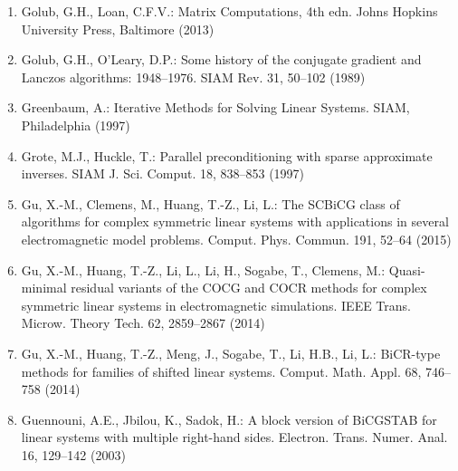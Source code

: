 \begin{enumerate}[label=\arabic*.,ref=\arabic*,leftmargin=3em]
\item\label{bib:source-79}Golub, G.H., Loan, C.F.V.: Matrix Computations, 4th edn. Johns Hopkins University Press, Baltimore (2013)

\item\label{bib:source-80}Golub, G.H., O’Leary, D.P.: Some history of the conjugate gradient and Lanczos algorithms: 1948–1976. SIAM Rev. 31, 50–102 (1989)

\item\label{bib:source-81}Greenbaum, A.: Iterative Methods for Solving Linear Systems. SIAM, Philadelphia (1997)

\item\label{bib:source-82}Grote, M.J., Huckle, T.: Parallel preconditioning with sparse approximate inverses. SIAM J. Sci. Comput. 18, 838–853 (1997)

\item\label{bib:source-83}Gu, X.-M., Clemens, M., Huang, T.-Z., Li, L.: The SCBiCG class of algorithms for complex symmetric linear systems with applications in several electromagnetic model problems. Comput. Phys. Commun. 191, 52–64 (2015)

\item\label{bib:source-84}Gu, X.-M., Huang, T.-Z., Li, L., Li, H., Sogabe, T., Clemens, M.: Quasi-minimal residual variants of the COCG and COCR methods for complex symmetric linear systems in electromagnetic simulations. IEEE Trans. Microw. Theory Tech. 62, 2859–2867 (2014)

\item\label{bib:source-85}Gu, X.-M., Huang, T.-Z., Meng, J., Sogabe, T., Li, H.B., Li, L.: BiCR-type methods for families of shifted linear systems. Comput. Math. Appl. 68, 746–758 (2014)

\item\label{bib:source-86}Guennouni, A.E., Jbilou, K., Sadok, H.: A block version of BiCGSTAB for linear systems with multiple right-hand sides. Electron. Trans. Numer. Anal. 16, 129–142 (2003)


\end{enumerate}
